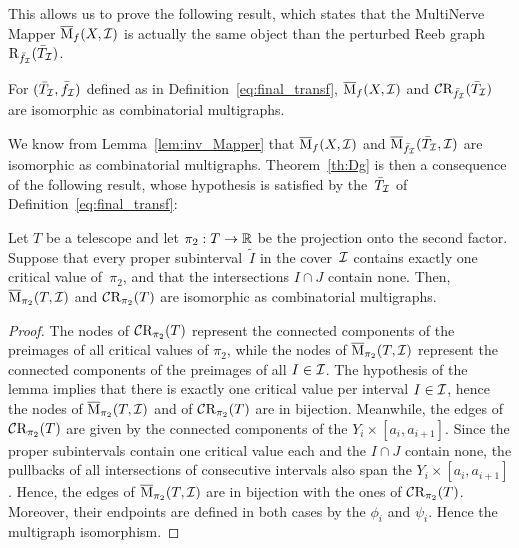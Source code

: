 This allows us to prove the following result, which states that the MultiNerve Mapper $\overline{\mathrm{M}}_f(X,\mathcal{I})$
is actually the same object than the perturbed Reeb graph $\mathrm{R}_{\bar f_{\mathcal I}}(\bar T_{\mathcal I})$. 

\begin{thm}\label{th:Dg}
For $(\bar T_{\mathcal I},\bar f_{\mathcal I})$ defined as in Definition~\ref{eq:final_transf}, $\overline{\mathrm{M}}_f(X,\mathcal{I})$ and
$\mathcal{C}\mathrm{R}_{\bar f_{\mathcal I}}(\bar T_{\mathcal I})$ are isomorphic as combinatorial multigraphs.
\end{thm}
%
We know from Lemma~\ref{lem:inv_Mapper} that
$\overline{\mathrm{M}}_f(X,\mathcal{I})$ and $\overline{\mathrm{M}}_{\bar f_{\mathcal I}}(\bar T_{\mathcal I},\mathcal{I})$ are isomorphic as combinatorial multigraphs. Theorem~\ref{th:Dg} is 
then a consequence of the following result, whose hypothesis is satisfied by the~$\bar T_{\mathcal I}$ of
Definition~\ref{eq:final_transf}:
%
\begin{lem}\label{lem:MMapper-Reeb-isom} 
Let $T$ be a telescope and let $\pi_2:T\to\mathbb{R}$ be the projection onto the
second factor.  Suppose that every proper subinterval~$\tilde I$ in the
cover~$\mathcal{I}$ contains exactly one critical value of~$\pi_2$, and that the
intersections $I\cap J$ contain none. Then, $\overline{\mathrm{M}}_{\pi_2}(T,\mathcal{I})$ and
$\mathcal{C}\mathrm{R}_{\pi_2}(T)$ are isomorphic as combinatorial multigraphs.
\end{lem}
%
\begin{proof}
The nodes of $\mathcal{C}\mathrm{R}_{\pi_2}(T)$ represent the connected components of the
preimages of all critical values of $\pi_2$, while the nodes of
$\overline{\mathrm{M}}_{\pi_2}(T,\mathcal{I})$ represent the connected components of the preimages of all
$I\in\mathcal{I}$.  The hypothesis of the lemma implies that there is exactly
one critical value per interval $I\in\mathcal{I}$, hence the nodes of
$\overline{\mathrm{M}}_{\pi_2}(T,\mathcal{I})$ and of $\mathcal{C}\mathrm{R}_{\pi_2}(T)$ are in
bijection.  Meanwhile, the edges of $\mathcal{C}\mathrm{R}_{\pi_2}(T)$
are given by the connected components of the $Y_i\times[a_i,a_{i+1}]$. Since the proper subintervals
contain one critical value each and the $I\cap J$ contain none, the
pullbacks of all intersections of consecutive intervals also span the
$Y_i\times[a_i,a_{i+1}]$. Hence, the edges of $\overline{\mathrm{M}}_{\pi_2}(T,\mathcal{I})$
are in bijection with the ones of
$\mathcal{C}\mathrm{R}_{\pi_2}(T)$. Moreover, their endpoints are defined
in both cases by the $\phi_i$ and $\psi_i$. Hence the multigraph
isomorphism.
\end{proof}

